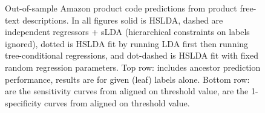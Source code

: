 \documentclass{article}
\begin{document}
\begin{figure}[htbp]
\begin{center}
\caption{Out-of-sample Amazon product code predictions from product free-text descriptions.  In all figures solid is HSLDA, dashed are independent regressors + sLDA (hierarchical constraints on labels ignored), dotted is HSLDA fit by running LDA first then running tree-conditional regressions, and dot-dashed is HSLDA fit with fixed random regression parameters.  Top row:   includes ancestor prediction performance,   results are for given (leaf) labels alone.  Bottom row:  are the sensitivity curves from  aligned on threshold value,   are the 1-specificity curves from  aligned on threshold value.}
\label{fig:icd9}
\end{center}
\end{figure}







\end{document}
